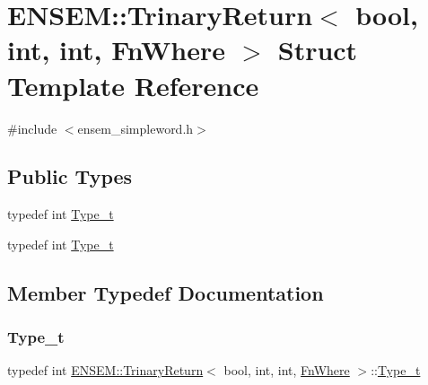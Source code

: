\hypertarget{structENSEM_1_1TrinaryReturn_3_01bool_00_01int_00_01int_00_01FnWhere_01_4}{}\section{E\+N\+S\+EM\+:\+:Trinary\+Return$<$ bool, int, int, Fn\+Where $>$ Struct Template Reference}
\label{structENSEM_1_1TrinaryReturn_3_01bool_00_01int_00_01int_00_01FnWhere_01_4}


{\ttfamily \#include $<$ensem\+\_\+simpleword.\+h$>$}

\subsection*{Public Types}
\begin{DoxyCompactItemize}
\item 
typedef int \mbox{\hyperlink{structENSEM_1_1TrinaryReturn_3_01bool_00_01int_00_01int_00_01FnWhere_01_4_a903989cc198f060fec5777b5c3b18657}{Type\+\_\+t}}
\item 
typedef int \mbox{\hyperlink{structENSEM_1_1TrinaryReturn_3_01bool_00_01int_00_01int_00_01FnWhere_01_4_a903989cc198f060fec5777b5c3b18657}{Type\+\_\+t}}
\end{DoxyCompactItemize}


\subsection{Member Typedef Documentation}
\mbox{\label{structENSEM_1_1TrinaryReturn_3_01bool_00_01int_00_01int_00_01FnWhere_01_4_a903989cc198f060fec5777b5c3b18657}} 
\subsubsection{\texorpdfstring{Type\_t}{Type\_t}\hspace{0.1cm}{\footnotesize\ttfamily [1/2]}}
{\footnotesize\ttfamily typedef int \mbox{\hyperlink{structENSEM_1_1TrinaryReturn}{E\+N\+S\+E\+M\+::\+Trinary\+Return}}$<$ bool, int, int, \mbox{\hyperlink{structENSEM_1_1FnWhere}{Fn\+Where}} $>$\+::\mbox{\hyperlink{structENSEM_1_1TrinaryReturn_3_01bool_00_01int_00_01int_00_01FnWhere_01_4_a903989cc198f060fec5777b5c3b18657}{Type\+\_\+t}}}


